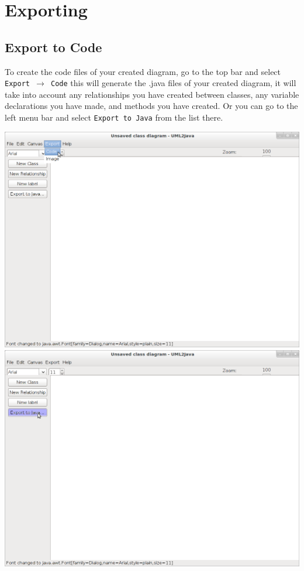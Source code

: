 \documentclass[a4paper]{article}
\begin{document}
\section{Exporting}
\subsection{Export to Code} 
To create the code files of your created diagram, go to the top bar and select \texttt{Export $\rightarrow$ Code} this will generate the .java files of your created diagram, it will take into account any relationships you have created between classes, any variable declarations you have made, and methods you have created. Or you can go to the left menu bar and select \texttt{Export to Java} from the list there. \par

\begin{center}\includegraphics[trim = 0pt 300pt 700pt 0pt, clip, scale=0.4]{./images/export-code1.png}
\includegraphics[trim = 0pt 300pt 700pt 0pt, clip, scale=0.4]{./images/export-code2.png} \end{center}
\end{document}

